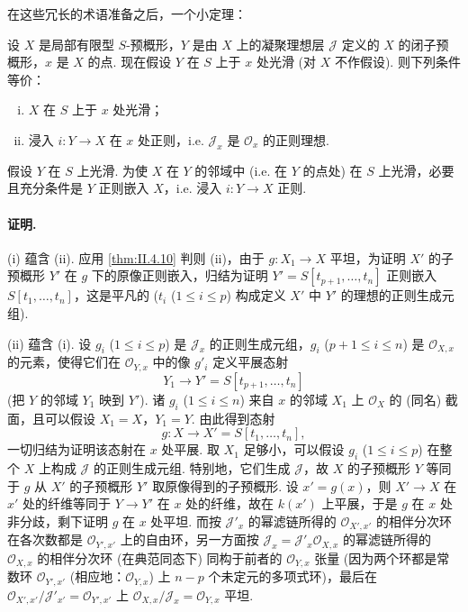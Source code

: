 在这些冗长的术语准备之后，一个小定理：

\begin{theorem}\label{thm:II.4.15}
设 $X$ 是局部有限型 $S$-预概形，$Y$ 是由 $X$ 上的凝聚理想层 $\mathcal{J}$ 定义的 $X$ 的闭子预概形，$x$ 是 $X$ 的点. 现在假设 $Y$ 在 $S$ 上于 $x$ 处光滑 (对 $X$ 不作假设). 则下列条件等价：
\begin{enumerate}[(i)]
\item $X$ 在 $S$ 上于 $x$ 处光滑；
\item 浸入 $i \colon Y \to X$ 在 $x$ 处正则，i.e. $\mathcal{J}_x$ 是 $\mathcal{O}_x$ 的正则理想.
\end{enumerate}
\end{theorem}

\begin{corollary}\label{cor:II.4.16}
假设 $Y$ 在 $S$ 上光滑. 为使 $X$ 在 $Y$ 的邻域中 (i.e. 在 $Y$ 的点处) 在 $S$ 上光滑，必要且充分条件是 $Y$ 正则嵌入 $X$，i.e. 浸入 $i \colon Y \to X$ 正则.
\end{corollary}

\paragraph*{证明.} (i) 蕴含 (ii). 应用 \ref{thm:II.4.10} 判则 (ii)，由于 $g \colon X_1 \to X$ 平坦，为证明 $X'$ 的子预概形 $Y'$ 在 $g$ 下的原像正则嵌入，归结为证明 $Y' = S[t_{p+1}, \dots, t_n]$ 正则嵌入 $S[t_1, \dots, t_n]$，这是平凡的 ($t_i$ ($1 \leqslant i \leqslant p$) 构成定义 $X'$ 中 $Y'$ 的理想的正则生成元组).

(ii) 蕴含 (i). 设 $g_i$ ($1 \leqslant i \leqslant p$) 是 $\mathcal{J}_x$ 的正则生成元组，$g_i$ ($p+1 \leqslant i \leqslant n$) 是 $\mathcal{O}_{X,x}$ 的元素，使得它们在 $\mathcal{O}_{Y,x}$ 中的像 $g'_i$ 定义平展态射
\[
Y_1 \longrightarrow Y' = S[t_{p+1}, \dots, t_n]
\]
(把 $Y$ 的邻域 $Y_1$ 映到 $Y'$). 诸 $g_i$ ($1 \leqslant i \leqslant n$) 来自 $x$ 的邻域 $X_1$ 上 $\mathcal{O}_X$ 的 (同名) 截面，且可以假设 $X_1 = X$，$Y_1 = Y$. 由此得到态射
\[
g \colon X \longrightarrow X' = S[t_1, \dots, t_n],
\]
一切归结为证明该态射在 $x$ 处平展. 取 $X_1$ 足够小，可以假设 $g_i$ ($1 \leqslant i \leqslant p$) 在整个 $X$ 上构成 $\mathcal{J}$ 的正则生成元组. 特别地，它们生成 $\mathcal{J}$，故 $X$ 的子预概形 $Y$ 等同于 $g$ 从 $X'$ 的子预概形 $Y'$ 取原像得到的子预概形. 设 $x' = g(x)$，则 $X' \to X$ 在 $x'$ 处的纤维等同于 $Y \to Y'$ 在 $x$ 处的纤维，故在 $k(x')$ 上平展，于是 $g$ 在 $x$ 处非分歧，剩下证明 $g$ 在 $x$ 处平坦. 而按 $\mathcal{J}'_x$ 的幂滤链所得的 $\mathcal{O}_{X',x'}$ 的相伴分次环在各次数都是 $\mathcal{O}_{Y',x'}$ 上的自由环，另一方面按 $\mathcal{J}_x = \mathcal{J}'_x \mathcal{O}_{X,x}$ 的幂滤链所得的 $\mathcal{O}_{X,x}$ 的相伴分次环 (在典范同态下) 同构于前者的 $\mathcal{O}_{Y,x}$ 张量 (因为两个环都是常数环 $\mathcal{O}_{Y',x'}$ (相应地：$\mathcal{O}_{Y,x}$) 上 $n - p$ 个未定元的多项式环)，最后在 $\mathcal{O}_{X',x'}/\mathcal{J}'_{x'} = \mathcal{O}_{Y',x'}$ 上 $\mathcal{O}_{X,x}/\mathcal{J}_x = \mathcal{O}_{Y,x}$ 平坦.

